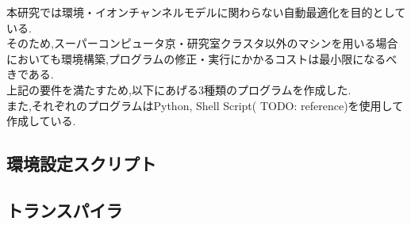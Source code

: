 本研究では環境・イオンチャンネルモデルに関わらない自動最適化を目的としている.\\
そのため,スーパーコンピュータ京・研究室クラスタ以外のマシンを用いる場合においても環境構築,プログラムの修正・実行にかかるコストは最小限になるべきである.\\
上記の要件を満たすため,以下にあげる3種類のプログラムを作成した.\\
また,それぞれのプログラムはPython, Shell Script( TODO: reference)を使用して作成している.\\
\subsection{環境設定スクリプト}




\subsection{トランスパイラ}

